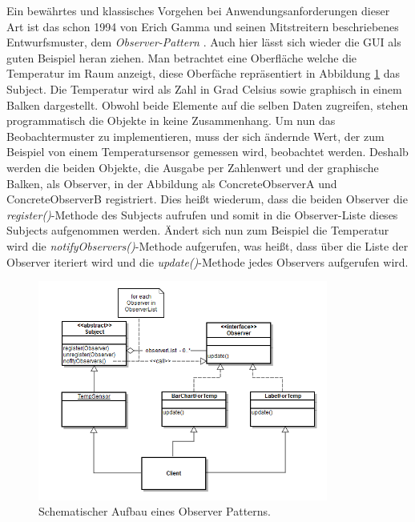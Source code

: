 Ein bewährtes und klassisches Vorgehen bei Anwendungsanforderungen dieser Art ist das schon 1994 von Erich Gamma und seinen Mitstreitern beschriebenes Entwurfsmuster, dem \textit{Observer-Pattern} \cite{Gamma.2011}. Auch hier lässt sich wieder die GUI als guten Beispiel heran ziehen. Man betrachtet eine Oberfläche welche die Temperatur im Raum anzeigt, diese Oberfäche repräsentiert in Abbildung \ref{pic:observerpattern} das Subject. Die Temperatur wird als Zahl in Grad Celsius sowie graphisch in einem Balken dargestellt. Obwohl beide Elemente auf die selben Daten zugreifen, stehen programmatisch die Objekte in keine Zusammenhang. Um nun das Beobachtermuster zu implementieren, muss der sich ändernde Wert, der zum Beispiel von einem Temperatursensor gemessen wird, beobachtet werden. Deshalb werden die beiden Objekte, die Ausgabe per Zahlenwert und der graphische Balken, als Observer, in der Abbildung als ConcreteObserverA und ConcreteObserverB registriert. Dies heißt wiederum, dass die beiden Observer die \textit{register()}-Methode des Subjects aufrufen und somit in die Observer-Liste dieses Subjects aufgenommen werden. Ändert sich nun zum Beispiel die Temperatur wird die \textit{notifyObservers()}-Methode aufgerufen, was heißt, dass über die Liste der Observer iteriert wird und die \textit{update()}-Methode jedes Observers aufgerufen wird.
\begin{figure}
	\centering
	\includegraphics[width=0.85\textwidth]{Abb/observerpattern_self}
	\caption{Schematischer Aufbau eines Observer Patterns.}
	\label{pic:observerpattern}
\end{figure}
